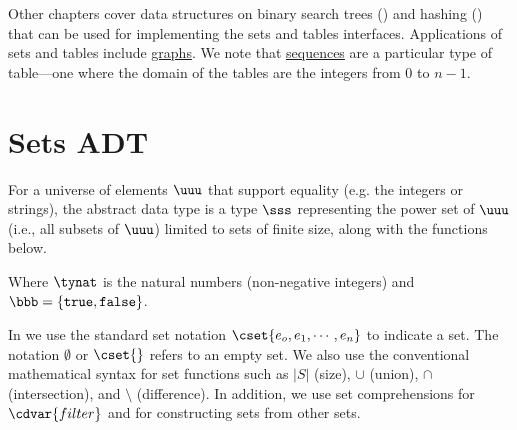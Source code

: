 \begin{gram}
Other chapters cover data structures on binary search trees
() and hashing () that can be used for
implementing the sets and tables interfaces. 
%
Applications of sets and tables include \href{ch:graphs::graphs}{graphs}.
%
We note that \href{ch:sequences::adt}{sequences} are a particular type of table---one where the domain of the tables are the integers from $0$ to $n-1$.  
\end{gram}



\section{Sets ADT}

\begin{datatype}[Sets]

\label{adt:sets} 

For a universe of elements $\uuu$ that support equality (e.g. the integers or strings), the 
 abstract data type is a type $\sss$ representing the power 
set of $\uuu$ (i.e., all subsets of $\uuu$) limited to sets of finite 
size, along with the functions below. 
{\normalsize

}
Where $\tynat$ is 
the natural numbers (non-negative integers) and $\bbb = \{\texttt{true},
\texttt{false}\}$.
\end{datatype}

\begin{syntax}[Sets] 
\label{syn:sets}
In \pml{}  we use the standard set notation $\cset{e_o,e_1,\cdots,e_n}$ to
  indicate a set.  The notation $\emptyset$ or $\cset{}$ refers to an
  empty set. We also use the conventional mathematical syntax for set
  functions such as $|S|$ (size), $\cup$ (union), $\cap$
  (intersection), and $\setminus$ (difference).  In addition, we use
  set comprehensions for $\cdvar{filter}$ and for constructing sets from
  other sets.
\end{syntax}

